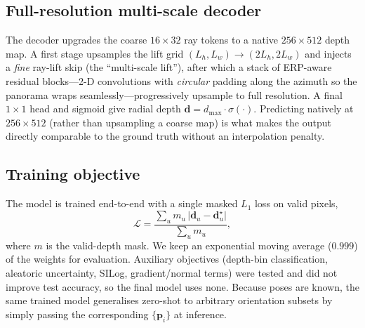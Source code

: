 \subsection{Full-resolution multi-scale decoder}
The decoder upgrades the coarse $16\times32$ ray tokens to a native $256\times512$
depth map. A first stage upsamples the lift grid $ (L_h,L_w)\!\to\!(2L_h,2L_w)$ and
injects a \emph{fine} ray-lift skip (the ``multi-scale lift''), after which a stack of
ERP-aware residual blocks---2-D convolutions with \emph{circular} padding along the
azimuth so the panorama wraps seamlessly---progressively upsample to full resolution.
A final $1{\times}1$ head and sigmoid give radial depth
$\mathbf{d}=d_{\max}\cdot\sigma(\cdot)$. Predicting natively at $256\times512$ (rather
than upsampling a coarse map) is what makes the output directly comparable to the
ground truth without an interpolation penalty.

\subsection{Training objective}
The model is trained end-to-end with a single masked $L_1$ loss on valid pixels,
\begin{equation}
\mathcal{L}=\frac{\sum_{u} m_u\,\lvert \mathbf{d}_u-\mathbf{d}^{\star}_u\rvert}{\sum_u m_u},
\end{equation}
where $m$ is the valid-depth mask. We keep an exponential moving average
($0.999$) of the weights for evaluation. Auxiliary objectives (depth-bin
classification, aleatoric uncertainty, SILog, gradient/normal terms) were tested and
did not improve test accuracy, so the final model uses none. Because poses are known,
the same trained model generalises zero-shot to arbitrary orientation subsets by
simply passing the corresponding $\{\mathbf{p}_i\}$ at inference.
